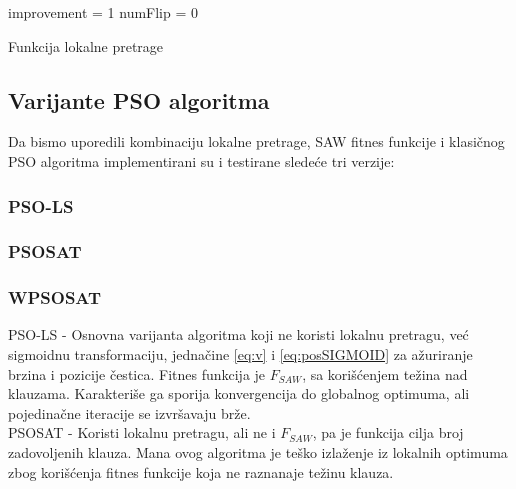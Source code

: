 \documentclass{article}
\begin{document}

\begin{algorithm}[H]
\SetAlgoLined
{}

\BlankLine
 improvement = 1\;
 numFlip = 0\;
 \caption{Funkcija lokalne pretrage}
\end{algorithm}



\subsection{Varijante PSO algoritma}
Da bismo uporedili kombinaciju lokalne pretrage, SAW fitnes funkcije i klasičnog PSO algoritma implementirani su i testirane sledeće tri verzije: \\

\subsubsection{PSO-LS}

\subsubsection{PSOSAT}

\subsubsection{WPSOSAT}


PSO-LS - Osnovna varijanta algoritma koji ne koristi lokalnu pretragu, već sigmoidnu transformaciju, jednačine \ref{eq:v} i \ref{eq:posSIGMOID} za ažuriranje brzina i pozicije čestica. Fitnes funkcija je $F_{SAW}$, sa korišćenjem težina nad klauzama. Karakteriše ga sporija konvergencija do globalnog optimuma, ali pojedinačne iteracije se izvršavaju brže.\\

PSOSAT - Koristi lokalnu pretragu, ali ne i $F_{SAW}$, pa je funkcija cilja broj zadovoljenih klauza. Mana ovog algoritma je teško izlaženje iz lokalnih optimuma zbog korišćenja fitnes funkcije koja ne raznanaje težinu klauza.\\
\end{document}
